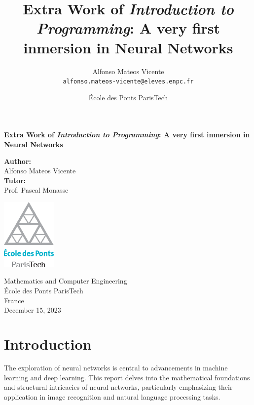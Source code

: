 \documentclass{article}
\title{Extra Work of \textit{Introduction to Programming}: A very first inmersion in Neural Networks} %
\author{Alfonso Mateos Vicente\\ \texttt{alfonso.mateos-vicente@eleves.enpc.fr}} %
\date{École des Ponts ParisTech} %
\begin{document}
\begin{titlepage}
    \begin{center}
        \vspace*{1cm}
        
        \Huge
        \textbf{Extra Work of \textit{Introduction to Programming}: A very first inmersion in Neural Networks}
        
        \vspace{1.5cm}

        \Large
        \textbf{Author:} \\
        \vspace{0.25cm}
        \LARGE
        Alfonso Mateos Vicente \\
        \vspace{0.5cm}
        \Large
        \textbf{Tutor:} \\
        \vspace{0.25cm}
        \LARGE
        Prof. Pascal Monasse

        \vfill
        
        \includegraphics[width=0.2\textwidth]{./logo-enpc.eps}
        
        \vspace{1cm}
        
        \normalsize
        Mathematics and Computer Engineering \\
        École des Ponts ParisTech \\
        France \\
        December 15, 2023
    \end{center}
    \restoregeometry
\end{titlepage}


\newpage
\tableofcontents
\newpage


\section{Introduction}

The exploration of neural networks is central to advancements in machine learning and deep learning. This report delves into the mathematical foundations and structural intricacies of neural networks, particularly emphasizing their application in image recognition and natural language processing tasks.
\end{document}
